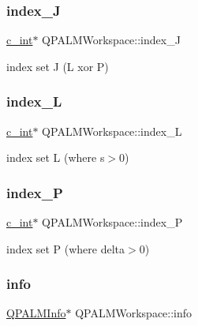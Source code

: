 \subsubsection{\texorpdfstring{index\_J}{index\_J}}
{\footnotesize\ttfamily \mbox{\hyperlink{global__opts_8h_aa3217a0f49d3e52b74e9dd830c44472f}{c\+\_\+int}}$\ast$ Q\+P\+A\+L\+M\+Workspace\+::index\+\_\+J}



index set J (L xor P) 

\mbox{\label{structQPALMWorkspace_af1a5130d10eac6f1cca4e989592cffe4}} 
\subsubsection{\texorpdfstring{index\_L}{index\_L}}
{\footnotesize\ttfamily \mbox{\hyperlink{global__opts_8h_aa3217a0f49d3e52b74e9dd830c44472f}{c\+\_\+int}}$\ast$ Q\+P\+A\+L\+M\+Workspace\+::index\+\_\+L}



index set L (where s$>$0) 

\mbox{\label{structQPALMWorkspace_a45ccfcbf6d91b05ecac8df1b31dee2b9}} 
\subsubsection{\texorpdfstring{index\_P}{index\_P}}
{\footnotesize\ttfamily \mbox{\hyperlink{global__opts_8h_aa3217a0f49d3e52b74e9dd830c44472f}{c\+\_\+int}}$\ast$ Q\+P\+A\+L\+M\+Workspace\+::index\+\_\+P}



index set P (where delta$>$0) 

\mbox{\label{structQPALMWorkspace_a37b5c22c01352658c55dadcde7481222}} 
\subsubsection{\texorpdfstring{info}{info}}
{\footnotesize\ttfamily \mbox{\hyperlink{structQPALMInfo}{Q\+P\+A\+L\+M\+Info}}$\ast$ Q\+P\+A\+L\+M\+Workspace\+::info}



